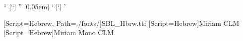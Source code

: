 \graphicspath{{img/}{./}}
\usepackage[french]{babel}
\usepackage{graphicx}
\usepackage{ulem} %
\usepackage{xcolor} 
\usepackage{tabularx}
\usepackage{parallel}
\usepackage{ragged2e} 


\usepackage{polyglossia}


\usepackage{multirow} 
\setmainlanguage{english}
\usepackage[autostyle]{csquotes}
%
    {\textquotedblleft}
    [\textquotedblleft]
    {\textquotedblright}
        [0.05em]
    {\textquoteleft}
    [\textquoteleft]
    {\textquoteright}




\newfontfamily{}
\newfontfamily{}
\newfontfamily{\hebrewfont}[Script=Hebrew, Path=./fonts/]{SBL_Hbrw.ttf}
\newfontfamily{\hebrewfontsf}[Script=Hebrew]{Miriam CLM}
\newfontfamily{\hebrewfonttt}[Script=Hebrew]{Miriam Mono CLM}
\newfontfamily{}

\usepackage{booktabs} %
\usepackage[skins]{tcolorbox}

